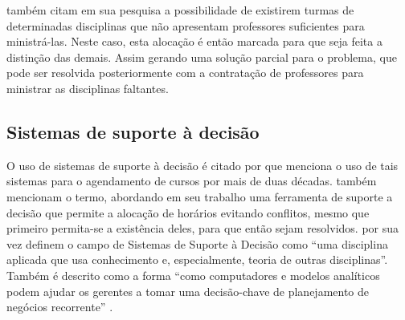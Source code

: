  também citam em sua pesquisa a possibilidade de existirem turmas de determinadas disciplinas que não apresentam professores suficientes para ministrá-las. Neste caso, esta alocação é então marcada para que seja feita a distinção das demais. Assim gerando uma solução parcial para o problema, que pode ser resolvida posteriormente com a contratação de professores para ministrar as disciplinas faltantes.

\subsection{Sistemas de suporte à decisão} \label{ssec:sistemas}                                            %

O uso de sistemas de suporte à decisão é citado por  que menciona o uso de tais sistemas para o agendamento de cursos por mais de duas décadas.  também mencionam o termo, abordando em seu trabalho uma ferramenta de suporte a decisão que permite a alocação de horários evitando conflitos, mesmo que primeiro permita-se a existência deles, para que então sejam resolvidos.  por sua vez definem o campo de Sistemas de Suporte à Decisão como ``uma disciplina aplicada que usa conhecimento e, especialmente, teoria de outras disciplinas''. Também é descrito como a forma ``como computadores e modelos analíticos podem ajudar os gerentes a tomar uma decisão-chave de planejamento de negócios recorrente'' \cite{Frada2008}.
